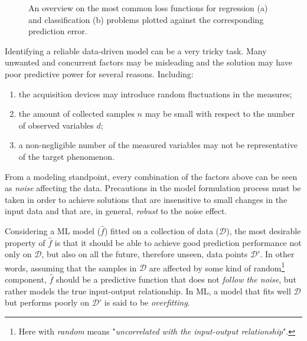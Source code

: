 	  \begin{figure}[!h]
	  	\centering
	  	\caption{An overview on the most common loss functions for regression (a) and classification (b) problems plotted against the corresponding prediction error.}\label{fig:loss}
	  \end{figure}

	  Identifying a reliable data-driven model can be a very tricky task. Many unwanted and concurrent factors may be misleading and the solution may have poor predictive power for several reasons.
		Including:
		\begin{enumerate}
			\item the acquisition devices may introduce random fluctuations in the measures;
			\item the amount of collected samples $n$ may be small with respect to the number of observed variables $d$;
			\item a non-negligible number of the measured variables may not be representative of the target phenomenon.
	  \end{enumerate}
		From a modeling standpoint, every combination of the factors above can be seen as \textit{noise} affecting the data.
		Precautions in the model formulation process must be taken in order to achieve solutions that are insensitive to small changes in the input data and that are, in general, \textit{robust} to the noise effect.

		Considering a ML model ($\hat f$) fitted on a collection of data ($\mathcal{D}$), the most desirable property of $\hat f$ is that it should be able to achieve good prediction performance not only on $\mathcal{D}$, but also on all the future, therefore unseen, data points $\mathcal{D}'$.
		In other words, assuming that the samples in $\mathcal{D}$ are affected by some kind of random\footnote{ Here with \textit{random} means "\textit{uncorrelated with the input-output relationship}".} component, $\hat f$ should be a predictive function that does not \textit{follow the noise}, but rather models the true input-output relationship.
		In ML, a model that fits well $\mathcal{D}$ but performs poorly on $\mathcal{D}'$ is said to be \textit{overfitting}.

